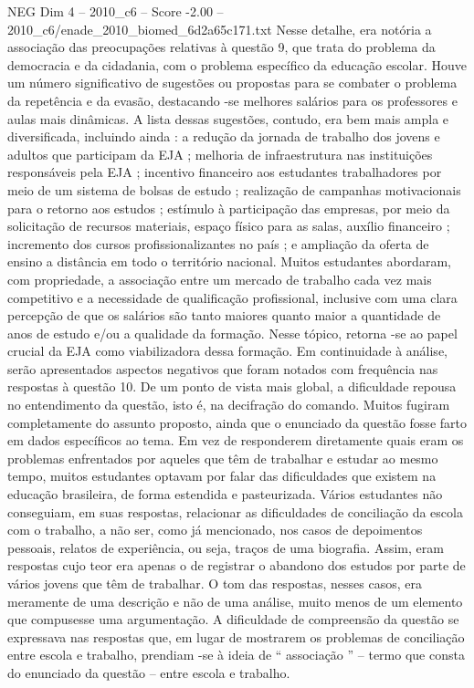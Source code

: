 \begin{textsample}{NEG Dim 4 – 2010\_c6 – Score -2.00 – 2010\_c6/enade\_2010\_biomed\_6d2a65c171.txt}
Nesse detalhe, era notória a associação das preocupações relativas à questão 9, que trata do problema da democracia e da cidadania, com o problema específico da educação escolar.
Houve um número significativo de sugestões ou propostas para se combater o problema da repetência e da evasão, destacando -se melhores salários para os professores e aulas mais dinâmicas.
A lista dessas sugestões, contudo, era bem mais ampla e diversificada, incluindo ainda : a redução da jornada de trabalho dos jovens e adultos que participam da EJA ; melhoria de infraestrutura nas instituições responsáveis pela EJA ; incentivo financeiro aos estudantes trabalhadores por meio de um sistema de bolsas de estudo ; realização de campanhas motivacionais para o retorno aos estudos ; estímulo à participação das empresas, por meio da solicitação de recursos materiais, espaço físico para as salas, auxílio financeiro ; incremento dos cursos profissionalizantes no país ; e ampliação da oferta de ensino a distância em todo o território nacional.
Muitos estudantes abordaram, com propriedade, a associação entre um mercado de trabalho cada vez mais competitivo e a necessidade de qualificação profissional, inclusive com uma clara percepção de que os salários são tanto maiores quanto maior a quantidade de anos de estudo e/ou a qualidade da formação.
Nesse tópico, retorna -se ao papel crucial da EJA como viabilizadora dessa formação.
Em continuidade à análise, serão apresentados aspectos negativos que foram notados com frequência nas respostas à questão 10.
De um ponto de vista mais global, a dificuldade repousa no entendimento da questão, isto é, na decifração do comando.
Muitos fugiram completamente do assunto proposto, ainda que o enunciado da questão fosse farto em dados específicos ao tema.
Em vez de responderem diretamente quais eram os problemas enfrentados por aqueles que têm de trabalhar e estudar ao mesmo tempo, muitos estudantes optavam por falar das dificuldades que existem na educação brasileira, de forma estendida e pasteurizada.
Vários estudantes não conseguiam, em suas respostas, relacionar as dificuldades de conciliação da escola com o trabalho, a não ser, como já mencionado, nos casos de depoimentos pessoais, relatos de experiência, ou seja, traços de uma biografia.
Assim, eram respostas cujo teor era apenas o de registrar o abandono dos estudos por parte de vários jovens que têm de trabalhar.
O tom das respostas, nesses casos, era meramente de uma descrição e não de uma análise, muito menos de um elemento que compusesse uma argumentação.
A dificuldade de compreensão da questão se expressava nas respostas que, em lugar de mostrarem os problemas de conciliação entre escola e trabalho, prendiam -se à ideia de “ associação ” – termo que consta do enunciado da questão – entre escola e trabalho.

\end{textsample}
